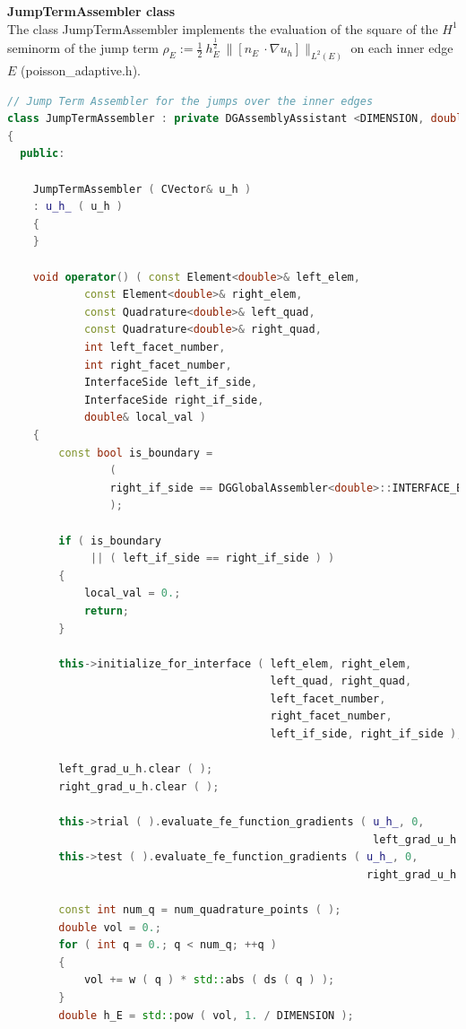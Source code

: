 \documentclass[a4paper, 11pt, twoside]{article}
\begin{document}
\textbf{JumpTermAssembler class}\\
The class JumpTermAssembler implements the evaluation of the square of the $H^1$ seminorm 
of the jump term $\rho_{E} :=\frac{1}{2}\ h_E^{\frac{1}{2}}\ \|[n_{E}\ \cdot \nabla u_h]\|_{L^2(E)}$ on each inner edge $E$ (poisson\_adaptive.h).

\begin{lstlisting}[language=C++, basicstyle={\footnotesize, \ttfamily}, keywordstyle=\color{blue}, numbers=none, tabsize=4]
// Jump Term Assembler for the jumps over the inner edges
class JumpTermAssembler : private DGAssemblyAssistant <DIMENSION, double>
{
  public:

    JumpTermAssembler ( CVector& u_h )
    : u_h_ ( u_h )
    {
    }

    void operator() ( const Element<double>& left_elem,
            const Element<double>& right_elem,
            const Quadrature<double>& left_quad,
            const Quadrature<double>& right_quad,
            int left_facet_number,
            int right_facet_number,
            InterfaceSide left_if_side,
            InterfaceSide right_if_side,
            double& local_val )
    {
        const bool is_boundary =
                (
                right_if_side == DGGlobalAssembler<double>::INTERFACE_BOUNDARY
                );

        if ( is_boundary
             || ( left_if_side == right_if_side ) )
        {
            local_val = 0.;
            return;
        }

        this->initialize_for_interface ( left_elem, right_elem,
                                         left_quad, right_quad,
                                         left_facet_number, 
                                         right_facet_number,
                                         left_if_side, right_if_side );

        left_grad_u_h.clear ( );
        right_grad_u_h.clear ( );

        this->trial ( ).evaluate_fe_function_gradients ( u_h_, 0,
                                                         left_grad_u_h );
        this->test ( ).evaluate_fe_function_gradients ( u_h_, 0, 
                                                        right_grad_u_h );

        const int num_q = num_quadrature_points ( );
        double vol = 0.;
        for ( int q = 0.; q < num_q; ++q )
        {
            vol += w ( q ) * std::abs ( ds ( q ) );
        }
        double h_E = std::pow ( vol, 1. / DIMENSION );


\end{lstlisting}
\end{document}
